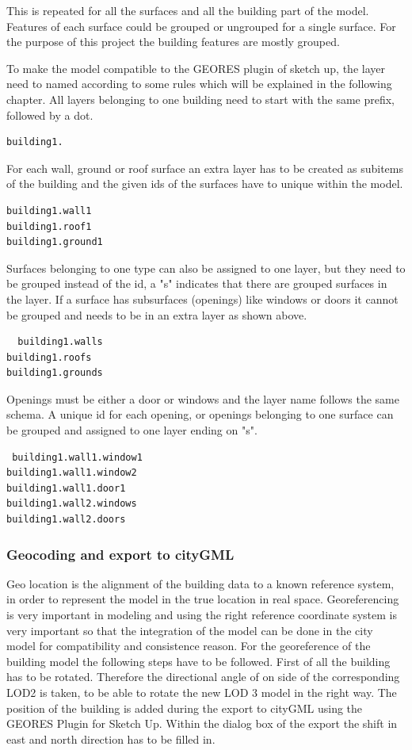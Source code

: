 This is repeated for all the surfaces and all the building part of the model. Features of each surface could be grouped or ungrouped for a single surface. For the purpose of this project the building features are mostly grouped. 

To make the model compatible to the GEORES plugin of sketch up, the layer need to named according to some rules which will be explained in the following chapter.
All layers belonging to one building need to start with the same prefix, followed by a dot.
\begin{lstlisting}
building1.
\end{lstlisting}

For each wall, ground or roof surface an extra layer has to be created as subitems of the building and the given ids of the surfaces have to unique within the model.
\begin{lstlisting}
building1.wall1
building1.roof1
building1.ground1
\end{lstlisting}
 Surfaces belonging to one type can also be assigned to one layer, but they need to be grouped instead of the id,  a "s" indicates that there are grouped surfaces in the layer.  If a surface has subsurfaces (openings) like windows or doors it cannot be grouped and needs to be in an extra layer as shown above.
 \begin{lstlisting}
  building1.walls
building1.roofs
building1.grounds
 \end{lstlisting}

Openings must be either a door or windows and the layer name follows the same schema.
A unique id for each opening, or openings belonging to one surface can be grouped and assigned to one layer ending on "s".

\begin{lstlisting}
 building1.wall1.window1
building1.wall1.window2
building1.wall1.door1
building1.wall2.windows
building1.wall2.doors
\end{lstlisting}

\subsubsection{Geocoding and export to cityGML}

Geo location is the alignment of the building data to a known reference system, in order to represent the model in the true location in real space.  Georeferencing is very important in modeling and using the right reference coordinate system is very important so that the integration of the model can be done in the city model for compatibility and consistence reason. For the georeference of the building model the following steps have to be followed.
First of all the building has to be rotated. Therefore the directional angle of on side of the corresponding LOD2 is taken, to be able to rotate the new LOD 3 model in the right way. The position of the building is added during the export to cityGML using the GEORES Plugin for Sketch Up. Within the dialog box of the export the shift in east and north direction has to be filled in.


